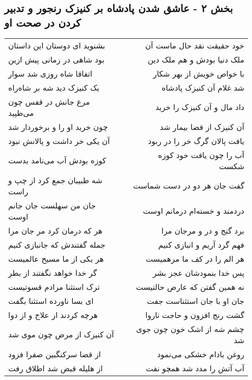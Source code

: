 \begin{center}
\section*{بخش ۲ - عاشق شدن پادشاه بر کنیزک رنجور و تدبیر کردن در صحت او}
\label{sec:sh002}
\begin{longtable}{l p{0.5cm} r}
بشنوید ای دوستان این داستان
&&
خود حقیقت نقد حال ماست آن
\\
بود شاهی در زمانی پیش ازین
&&
ملک دنیا بودش و هم ملک دین
\\
اتفاقا شاه روزی شد سوار
&&
با خواص خویش از بهر شکار
\\
یک کنیزک دید شه بر شاه‌راه
&&
شد غلام آن کنیزک پادشاه
\\
مرغ جانش در قفس چون می‌طپید
&&
داد مال و آن کنیزک را خرید
\\
چون خرید او را و برخوردار شد
&&
آن کنیزک از قضا بیمار شد
\\
آن یکی خر داشت و پالانش نبود
&&
یافت پالان گرگ خر را در ربود
\\
کوزه بودش آب می‌نامد بدست
&&
آب را چون یافت خود کوزه شکست
\\
شه طبیبان جمع کرد از چپ و راست
&&
گفت جان هر دو در دست شماست
\\
جان من سهلست جان جانم اوست
&&
دردمند و خسته‌ام درمانم اوست
\\
هر که درمان کرد مر جان مرا
&&
برد گنج و در و مرجان مرا
\\
جمله گفتندش که جانبازی کنیم
&&
فهم گرد آریم و انبازی کنیم
\\
هر یکی از ما مسیح عالمیست
&&
هر الم را در کف ما مرهمیست
\\
گر خدا خواهد نگفتند از بطر
&&
پس خدا بنمودشان عجز بشر
\\
ترک استثنا مرادم قسوتیست
&&
نه همین گفتن که عارض حالتیست
\\
ای بسا ناورده استثنا بگفت
&&
جان او با جان استثناست جفت
\\
هرچه کردند از علاج و از دوا
&&
گشت رنج افزون و حاجت ناروا
\\
آن کنیزک از مرض چون موی شد
&&
چشم شه از اشک خون چون جوی شد
\\
از قضا سرکنگبین صفرا فزود
&&
روغن بادام خشکی می‌نمود
\\
از هلیله قبض شد اطلاق رفت
&&
آب آتش را مدد شد همچو نفت
\\
\end{longtable}
\end{center}
